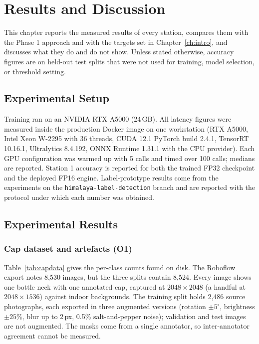 \chapter{Results and Discussion}
\label{ch:results}

This chapter reports the measured results of every station, compares them with the Phase 1 approach and with the targets set in Chapter~\ref{ch:intro}, and discusses what they do and do not show. Unless stated otherwise, accuracy figures are on held-out test splits that were not used for training, model selection, or threshold setting.

\section{Experimental Setup}
\label{sec:setup}
Training ran on an NVIDIA RTX A5000 (24\,GB). All latency figures were measured inside the production Docker image on one workstation (RTX A5000, Intel Xeon W-2295 with 36 threads, CUDA 12.1 PyTorch build 2.4.1, TensorRT 10.16.1, Ultralytics 8.4.192, ONNX Runtime 1.31.1 with the CPU provider). Each GPU configuration was warmed up with 5 calls and timed over 100 calls; medians are reported. Station 1 accuracy is reported for both the trained FP32 checkpoint and the deployed FP16 engine. Label-prototype results come from the experiments on the \texttt{himalaya-label-detection} branch and are reported with the protocol under which each number was obtained.

\section{Experimental Results}
\label{sec:experimental-results}

\subsection{Cap dataset and artefacts (O1)}
\label{sec:res-o1}
Table~\ref{tab:capdata} gives the per-class counts found on disk. The Roboflow export notes 8,530 images, but the three splits contain 8,524. Every image shows one bottle neck with one annotated cap, captured at $2048{\times}2048$ (a handful at $2048{\times}1536$) against indoor backgrounds. The training split holds 2,486 source photographs, each exported in three augmented versions (rotation $\pm5^\circ$, brightness $\pm25\%$, blur up to 2\,px, 0.5\% salt-and-pepper noise); validation and test images are not augmented. The masks come from a single annotator, so inter-annotator agreement cannot be measured.

